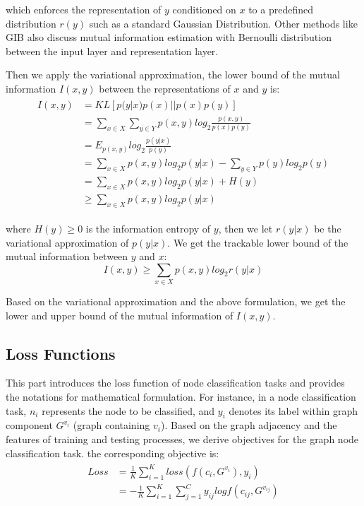 \documentclass[conference]{IEEEtran}
\begin{document}
which enforces the representation of $y$ conditioned on $x$ to a predefined distribution $r(y)$ such as a standard Gaussian Distribution. Other methods like GIB\cite{wu2020graph} also discuss mutual information estimation with Bernoulli distribution between the input layer and representation layer.

Then we apply the variational approximation, the lower bound of the mutual information $I(x,y)$ between the representations of $x$ and $y$ is: 
\setlength{\arraycolsep}{0.0em}
\begin{eqnarray}
\label{eqn_kl_5}
\begin{split}
I(x,y) &= KL[p(y|x)p(x)||p(x)p(y)]  \\
&= \sum\limits_{x \in X} \sum \limits_{y \in Y} p(x,y)log_2 \frac{p(x,y)}{p(x)p(y)} \\
&= E_{p(x,y)} log_2 \frac{p(y|x)}{p(y)} \\
& = \sum \limits_{x\in X}p(x,y)log_2 p(y|x)-\sum \limits_{y\in Y}p(y)log_2 p(y) \\
& = \sum \limits_{x\in X}p(x,y)log_2 p(y|x)+H(y) \\
& \ge  \sum \limits_{x\in X}p(x,y)log_2 p(y|x)
\end{split}
\end{eqnarray}
\setlength{\arraycolsep}{5pt}



where $ H(y) \ge 0 $ is the information entropy of $y$, then we let $r(y|x)$ be the variational approximation of $p(y|x)$. We get the trackable lower bound of the mutual information between $y$ and $x$:
\begin{equation}
I(x,y) \ge \sum_{x\in X}p(x,y)log_2 r(y|x)
\end{equation}

Based on the variational approximation and the above formulation, we get the lower and upper bound of the mutual information of $I(x,y)$.


\subsection{Loss Functions}

This part introduces the loss function of node classification tasks and provides the notations for mathematical formulation. For instance, in a node classification task, $n_i$ represents the node to be classified, and $y_i$ denotes its label within graph component $G^{v_i}$ (graph containing $v_i$). Based on the graph adjacency and the features of training and testing processes, we derive objectives for the graph node classification task. the corresponding objective is:
\setlength{\arraycolsep}{0.0em}
\begin{eqnarray}
\label{eqn_example}
\begin{split}
     Loss &= \frac{1}{K} \sum_{i=1}^K loss(f(c_i,G^{v_i}),y_i) \\
      &=- \frac{1}{K} \sum_{i=1}^K \sum_{j=1}^C y_{ij}logf(c_{ij},G^{v_{ij}})
\end{split}
\end{eqnarray}
\setlength{\arraycolsep}{5pt}
\end{document}
